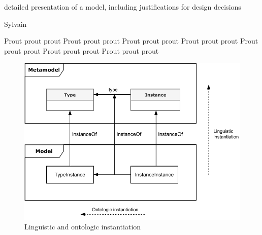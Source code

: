 detailed  presentation of a model, including justifications for design decisions


Sylvain

\begin{multicols}{2}

Prout prout prout Prout prout prout Prout prout prout Prout prout prout Prout prout prout Prout prout prout Prout prout prout 

\begin{figure}
    \centering
    \includegraphics[width=1.0 \columnwidth]{Figures/Instantiation.pdf}
    \caption{Linguistic and ontologic instantiation}
    \label{fig:LinguisticAndOntologicInstantiation}
\end{figure}

\end{multicols}
